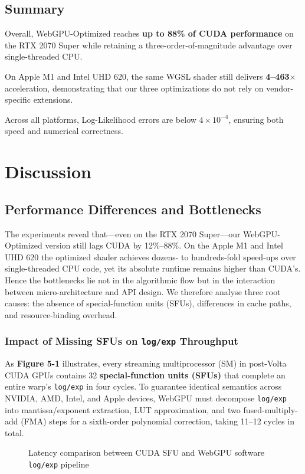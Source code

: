\documentclass[PhD]{PHlab-thesis}
\begin{document}
\section{Summary}
Overall, WebGPU-Optimized reaches \textbf{up to 88\% of CUDA performance} on the RTX 2070 Super while retaining a three-order-of-magnitude advantage over single-threaded CPU.

On Apple M1 and Intel UHD 620, the same WGSL shader still delivers \textbf{4–463$\times$} acceleration, demonstrating that our three optimizations do not rely on vendor-specific extensions.

Across all platforms, Log-Likelihood errors are below $4 \times 10^{-4}$, ensuring both speed and numerical correctness.

\chapter{Discussion}
\section{Performance Differences and Bottlenecks}
The experiments reveal that—even on the RTX 2070 Super—our WebGPU-Optimized version still lags CUDA by 12\%–88\%.
On the Apple M1 and Intel UHD 620 the optimized shader achieves dozens- to hundreds-fold speed-ups over single-threaded CPU code, yet its absolute runtime remains higher than CUDA’s.
Hence the bottlenecks lie not in the algorithmic flow but in the interaction between micro-architecture and API design.
We therefore analyse three root causes: the absence of special-function units (SFUs), differences in cache paths, and resource-binding overhead.

\subsection{Impact of Missing SFUs on \texttt{log/exp} Throughput}
As \textbf{Figure 5-1} illustrates, every streaming multiprocessor (SM) in post-Volta CUDA GPUs contains 32 \textbf{special-function units (SFUs)} that complete an entire warp’s \texttt{log/exp} in four cycles.
To guarantee identical semantics across NVIDIA, AMD, Intel, and Apple devices, WebGPU must decompose \texttt{log/exp} into mantissa/exponent extraction, LUT approximation, and two fused-multiply-add (FMA) steps for a sixth-order polynomial correction, taking 11–12 cycles in total.

\begin{figure}[h]
    \caption{Latency comparison between CUDA SFU and WebGPU software \texttt{log/exp} pipeline}
    \label{fig:log_exp_pipeline}
\end{figure}
\end{document}
